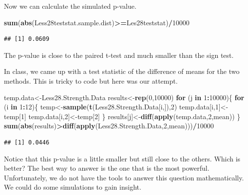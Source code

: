\documentclass[]{book}
\newenvironment{Shaded}{\begin{snugshade}}{\end{snugshade}}
\newcommand{\KeywordTok}[1]{\textcolor[rgb]{0.13,0.29,0.53}{\textbf{#1}}}
\newcommand{\DecValTok}[1]{\textcolor[rgb]{0.00,0.00,0.81}{#1}}
\newcommand{\ControlFlowTok}[1]{\textcolor[rgb]{0.13,0.29,0.53}{\textbf{#1}}}
\newcommand{\OperatorTok}[1]{\textcolor[rgb]{0.81,0.36,0.00}{\textbf{#1}}}
\newcommand{\NormalTok}[1]{#1}
\theoremstyle{definition}
\theoremstyle{definition}
\theoremstyle{definition}
\theoremstyle{remark}
\begin{document}
Now we can calculate the simulated p-value.

\begin{Shaded}
\begin{Highlighting}[]
\KeywordTok{sum}\NormalTok{(}\KeywordTok{abs}\NormalTok{(Less28teststat.sample.dist)}\OperatorTok{>=}\NormalTok{Les28teststat)}\OperatorTok{/}\DecValTok{10000}
\end{Highlighting}
\end{Shaded}

\begin{verbatim}
## [1] 0.0609
\end{verbatim}

The p-value is close to the paired t-test and much smaller than the sign
test.

In class, we came up with a test statistic of the difference of means
for the two methods. This is tricky to code but here was our attempt.

\begin{Shaded}
\begin{Highlighting}[]
\NormalTok{temp.data<-Less28.Strength.Data}
\NormalTok{results<-}\KeywordTok{rep}\NormalTok{(}\DecValTok{0}\NormalTok{,}\DecValTok{10000}\NormalTok{)}
\ControlFlowTok{for}\NormalTok{ (j }\ControlFlowTok{in} \DecValTok{1}\OperatorTok{:}\DecValTok{10000}\NormalTok{)\{}
\ControlFlowTok{for}\NormalTok{ (i }\ControlFlowTok{in} \DecValTok{1}\OperatorTok{:}\DecValTok{12}\NormalTok{)\{}
\NormalTok{temp<-}\KeywordTok{sample}\NormalTok{(}\KeywordTok{t}\NormalTok{(Less28.Strength.Data[i,]),}\DecValTok{2}\NormalTok{)}
\NormalTok{temp.data[i,}\DecValTok{1}\NormalTok{]<-temp[}\DecValTok{1}\NormalTok{]}
\NormalTok{temp.data[i,}\DecValTok{2}\NormalTok{]<-temp[}\DecValTok{2}\NormalTok{]}
\NormalTok{\}}
\NormalTok{results[j]<-}\KeywordTok{diff}\NormalTok{(}\KeywordTok{apply}\NormalTok{(temp.data,}\DecValTok{2}\NormalTok{,mean))}
\NormalTok{\}}
\KeywordTok{sum}\NormalTok{(}\KeywordTok{abs}\NormalTok{(results)}\OperatorTok{>}\KeywordTok{diff}\NormalTok{(}\KeywordTok{apply}\NormalTok{(Less28.Strength.Data,}\DecValTok{2}\NormalTok{,mean)))}\OperatorTok{/}\DecValTok{10000}
\end{Highlighting}
\end{Shaded}

\begin{verbatim}
## [1] 0.0446
\end{verbatim}

Notice that this p-value is a little smaller but still close to the
others. Which is better? The best way to answer is the one that is the
most powerful. Unfortunately, we do not have the tools to answer this
question mathematically. We could do some simulations to gain insight.
\end{document}
